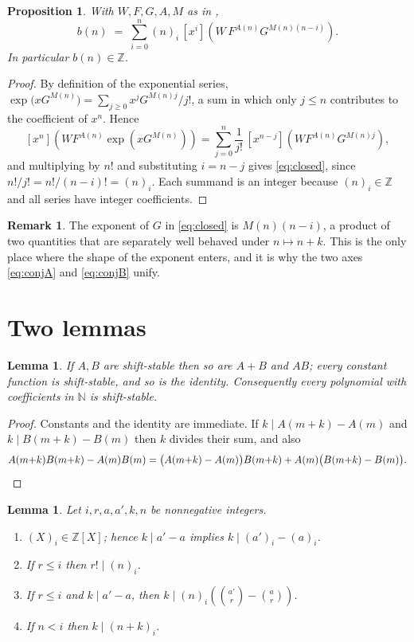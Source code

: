 \documentclass[11pt,a4paper]{article}
\theoremstyle{plain}
\newtheorem{proposition}[theorem]{Proposition}
\newtheorem{lemma}[theorem]{Lemma}
\theoremstyle{definition}
\newtheorem{remark}[theorem]{Remark}
\newcommand{\N}{\mathbb{N}}
\newcommand{\Z}{\mathbb{Z}}
\newcommand{\ff}[2]{(#1)_{#2}}
\newcommand{\coeff}[1]{[x^{#1}]}
\begin{document}
\begin{proposition}\label{prop:closed}
With $W,F,G,A,M$ as in ,
\begin{equation}\label{eq:closed}
  b(n)\;=\;\sum_{i=0}^{n}\ff{n}{i}\,
      \coeff{i}\!\left(W\,F^{A(n)}G^{M(n)(n-i)}\right).
\end{equation}
In particular $b(n)\in\Z$.
\end{proposition}

\begin{proof}
By definition of the exponential series,
$\exp\big(xG^{M(n)}\big)=\sum_{j\ge0}x^{j}G^{M(n)j}/j!$, a sum in which only $j\le n$
contributes to the coefficient of $x^n$. Hence
\[
  \coeff{n}\!\left(W F^{A(n)}\exp(xG^{M(n)})\right)
  =\sum_{j=0}^{n}\frac{1}{j!}\,\coeff{n-j}\!\left(W F^{A(n)}G^{M(n)j}\right),
\]
and multiplying by $n!$ and substituting $i=n-j$ gives \eqref{eq:closed}, since
$n!/j!=n!/(n-i)!=\ff{n}{i}$. Each summand is an integer because $\ff{n}{i}\in\Z$ and all
series have integer coefficients.
\end{proof}

\begin{remark}
The exponent of $G$ in \eqref{eq:closed} is $M(n)(n-i)$, a product of two quantities that
are separately well behaved under $n\mapsto n+k$. This is the only place where the shape
of the exponent enters, and it is why the two axes \eqref{eq:conjA} and \eqref{eq:conjB}
unify.
\end{remark}

\section{Two lemmas}\label{sec:lemmas}

\begin{lemma}\label{lem:ssclosure}
If $A,B$ are shift-stable then so are $A+B$ and $AB$; every constant function is
shift-stable, and so is the identity. Consequently every polynomial with coefficients in
$\N$ is shift-stable.
\end{lemma}

\begin{proof}
Constants and the identity are immediate. If $k\mid A(m+k)-A(m)$ and
$k\mid B(m+k)-B(m)$ then $k$ divides their sum, and also
\[
  A(m{+}k)B(m{+}k)-A(m)B(m)=\big(A(m{+}k)-A(m)\big)B(m{+}k)+A(m)\big(B(m{+}k)-B(m)\big).
  \qedhere
\]
\end{proof}

\begin{lemma}\label{lem:tools}
Let $i,r,a,a',k,n$ be nonnegative integers.
\begin{enumerate}[label=\textup{(\alph*)}]
  \item\label{it:poly} $\ff{X}{i}\in\Z[X]$; hence $k\mid a'-a$ implies
        $k\mid \ff{a'}{i}-\ff{a}{i}$.
  \item\label{it:divis} If $r\le i$ then $r!\mid \ff{n}{i}$.
  \item\label{it:key} If $r\le i$ and $k\mid a'-a$, then
        $k \;\Big|\; \ff{n}{i}\left(\binom{a'}{r}-\binom{a}{r}\right)$.
  \item\label{it:edge} If $n<i$ then $k\mid \ff{n+k}{i}$.
\end{enumerate}
\end{lemma}
\end{document}
